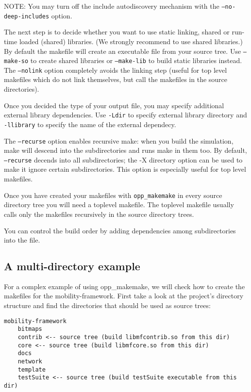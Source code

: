 NOTE: You may turn off the include autodiscovery mechanism with the \texttt{--no-deep-includes} option.

The next step is to decide whether you want to use static linking,
shared or run-time loaded (shared) libraries. (We strongly
recommend to use shared libraries.) By default the makefile will create an executable
file from your source tree. Use \texttt{--make-so} to create shared libraries
or \texttt{--make-lib} to build static libraries instead. The \texttt{--nolink}
option completely avoids the linking step (useful for top level makefiles which do
not link themselves, but call the makefiles in the source directories).

Once you decided the type of your output file, you may specify additional external library
dependencies. Use \texttt{-Ldir} to specify external library directory and \texttt{-llibrary}
to specify the name of the external dependecy.

The \texttt{--recurse} option enables recursive make: when you build the simulation, make
will descend into the subdirectories and runs make in them too.
By default, \texttt{--recurse} decends into all subdirectories; the -X directory option
can be used to make it ignore certain subdirectories. This option is especially useful
for top level makefiles.

Once you have created your makefiles with \texttt{opp\_makemake} in every source directory tree
you will need a toplevel makefile. The toplevel makefile usually calls only the makefiles
recursively in the source directory trees.

You can control the build order by adding dependencies among subdirectories
into the  file.

\subsection{A multi-directory example}

For a complex example of using opp\_makemake, we will check how to create
the makefiles for the mobility-framework. First take a look at the
project's directory structure and find the directories that should be used as
source trees:

\begin{verbatim}
mobility-framework
    bitmaps
    contrib <-- source tree (build libmfcontrib.so from this dir)
    core <-- source tree (build libmfcore.so from this dir)
    docs
    network
    template
    testSuite <-- source tree (build testSuite executable from this dir)
\end{verbatim}

